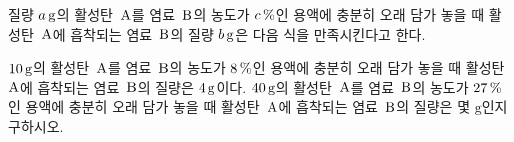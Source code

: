 질량 $a\mkern3mu \mathrm{g}$의 활성탄~$\mathrm{A}$를 염료~$\mathrm{B}$의 농도가 $c\mkern3mu \%$인 용액에 충분히 오래 담가 놓을 때 활성탄~$\mathrm{A}$에 흡착되는 염료~$\mathrm{B}$의 질량 $b\mkern3mu \mathrm{g}$은 다음 식을 만족시킨다고 한다. \par\smallskip{}\par\smallskip\noindent $10\mkern3mu \mathrm{g}$의 활성탄~$\mathrm{A}$를 염료~$\mathrm{B}$의 농도가 $8\mkern3mu \%$인 용액에 충분히 오래 담가 놓을 때 활성탄~$\mathrm{A}$에 흡착되는 염료~$\mathrm{B}$의 질량은 $4\mkern3mu \mathrm{g}$이다. $40\mkern3mu \mathrm{g}$의 활성탄~$\mathrm{A}$를 염료~$\mathrm{B}$의 농도가 $27\mkern3mu \%$인 용액에 충분히 오래 담가 놓을 때 활성탄~$\mathrm{A}$에 흡착되는 염료~$\mathrm{B}$의 질량은 몇 $\mathrm{g}$인지 구하시오. 

